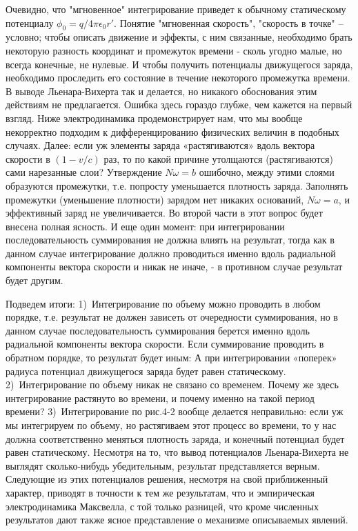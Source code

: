 \documentclass{article}
\begin{document}
Очевидно, что "мгновенное" интегрирование приведет к обычному статическому потенциалу ${\phi}_0 = q/4 \pi {\epsilon}_{0} {r'}$. Понятие "мгновенная скорость", "скорость в точке" – условно; чтобы описать движение и эффекты, с ним связанные, необходимо брать некоторую разность координат и промежуток времени - сколь угодно малые, но всегда конечные, не нулевые.  И чтобы получить потенциалы движущегося заряда, необходимо проследить его состояние в течение некоторого промежутка времени.  В выводе Льенара-Вихерта так и делается, но никакого обоснования этим действиям не предлагается. Ошибка здесь гораздо глубже, чем кажется на первый взгляд. Ниже электродинамика продемонстрирует нам, что мы вообще некорректно подходим к дифференцированию физических величин в подобных случаях. 
Далее: если уж элементы заряда «растягиваются» вдоль вектора скорости в $(1 - v/c)$ раз, то по какой причине утолщаются (растягиваются) сами нарезанные слои? Утверждение $N \omega = b$ ошибочно, между этими слоями образуются промежутки, т.е. попросту уменьшается плотность заряда.  Заполнять промежутки (уменьшение плотности) зарядом нет никаких оснований, $N \omega = a$, и эффективный заряд не увеличивается. Во второй части в этот вопрос будет внесена полная ясность. 
И еще один момент: при интегрировании последовательность суммирования не должна влиять на результат, тогда как в данном случае интегрирование должно проводиться именно вдоль радиальной компоненты вектора скорости и никак не иначе, - в противном случае результат будет другим. 

Подведем итоги:
1) Интегрирование по объему можно проводить в любом порядке, т.е. результат не должен зависеть от очередности суммирования, но в данном случае последовательность суммирования берется именно вдоль радиальной компоненты вектора скорости. Если суммирование проводить в обратном порядке, то результат будет иным:  А при интегрировании «поперек» радиуса потенциал движущегося заряда будет равен статическому. 
2) Интегрирование по объему никак не связано со временем. Почему же здесь интегрирование растянуто во времени, и почему именно на такой период времени? 
3) Интегрирование по рис.4-2 вообще делается неправильно: если уж мы интегрируем по объему, но растягиваем этот процесс во времени, то у нас должна соответственно меняться плотность заряда, и конечный потенциал будет равен статическому. 
Несмотря на то, что вывод потенциалов Льенара-Вихерта не выглядят сколько-нибудь убедительным, результат представляется верным. Следующие из этих потенциалов решения, несмотря на свой приближенный характер, приводят в точности к тем же результатам, что и эмпирическая электродинамика Максвелла, с той только разницей, что кроме численных результатов дают также ясное представление о механизме описываемых явлений. 
\end{document}
